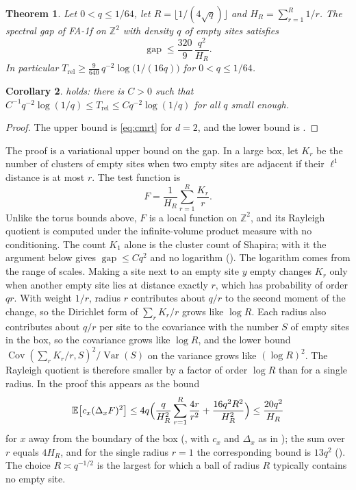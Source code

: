 \documentclass[11pt]{article}
\newtheorem{theorem}{Theorem}[section]
\newtheorem{corollary}[theorem]{Corollary}
\theoremstyle{remark}
\newcommand{\Z}{\mathbb Z}
\newcommand{\E}{\mathbb E}
\newcommand{\1}{\mathbf 1}
\DeclareMathOperator{\Var}{Var}
\DeclareMathOperator{\Cov}{Cov}
\DeclareMathOperator{\gap}{gap}
\newcommand{\Trel}{T_{\mathrm{rel}}}
\begin{document}
\begin{theorem}\label{thm:main}
Let $0<q\le 1/64$, let $R=\lfloor 1/(4\sqrt q)\rfloor$ and $H_R=\sum_{r=1}^R 1/r$. The spectral gap of FA-1f on $\Z^2$ with density $q$ of empty sites satisfies
\[
\gap\le\frac{320}{9}\,\frac{q^2}{H_R}.
\]
In particular $\Trel\ge \frac{9}{640}\,q^{-2}\log\bigl(1/(16q)\bigr)$ for $0<q\le1/64$.
\end{theorem}

\begin{corollary}\label{cor:main}
 holds: there is $C>0$ such that $C^{-1}q^{-2}\log(1/q)\le\Trel\le Cq^{-2}\log(1/q)$ for all $q$ small enough.
\end{corollary}

\begin{proof}
The upper bound is \eqref{eq:cmrt} for $d=2$, and the lower bound is .
\end{proof}

The proof is a variational upper bound on the gap. In a large box, let $K_r$ be the number of clusters of empty sites when two empty sites are adjacent if their $\ell^1$ distance is at most $r$. The test function is
\[
F=\frac1{H_R}\sum_{r=1}^R\frac{K_r}{r}.
\]
Unlike the torus bounds above, $F$ is a local function on $\Z^2$, and its Rayleigh quotient is computed under the infinite-volume product measure with no conditioning. The count $K_1$ alone is the cluster count of Shapira; with it the argument below gives $\gap\le Cq^2$ and no logarithm (). The logarithm comes from the range of scales. Making a site next to an empty site $y$ empty changes $K_r$ only when another empty site lies at distance exactly $r$, which has probability of order $qr$. With weight $1/r$, radius $r$ contributes about $q/r$ to the second moment of the change, so the Dirichlet form of $\sum_rK_r/r$ grows like $\log R$. Each radius also contributes about $q/r$ per site to the covariance with the number $S$ of empty sites in the box, so the covariance grows like $\log R$, and the lower bound $\Cov(\sum_rK_r/r,S)^2/\Var(S)$ on the variance grows like $(\log R)^2$. The Rayleigh quotient is therefore smaller by a factor of order $\log R$ than for a single radius. In the proof this appears as the bound
\[
\E\bigl[c_x(\Delta_xF)^2\bigr]\le4q\Bigl(\frac{q}{H_R^2}\sum_{r=1}^R\frac{4r}{r^2}+\frac{16q^2R^2}{H_R^2}\Bigr)\le\frac{20q^2}{H_R}
\]
for $x$ away from the boundary of the box (, with $c_x$ and $\Delta_x$ as in ); the sum over $r$ equals $4H_R$, and for the single radius $r=1$ the corresponding bound is $13q^2$ (). The choice $R\asymp q^{-1/2}$ is the largest for which a ball of radius $R$ typically contains no empty site.
\end{document}
